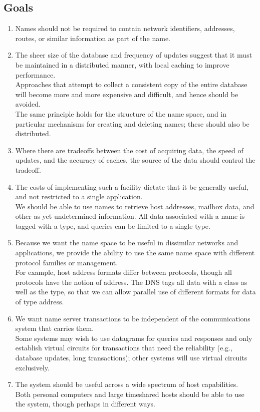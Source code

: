 \subsection{Goals}
\begin{enumerate}
\item{Names should not be required to contain network identifiers, addresses, routes, or similar information as part of the name.}
\item{The sheer size of the database and frequency of updates suggest that it must be maintained in a distributed manner, with local caching to improve performance.\\
Approaches that attempt to collect a consistent copy of the entire database will become more and more expensive and difficult, and hence should be avoided.\\
The same principle holds for the structure of the name space, and in particular mechanisms for creating and deleting names; these should also be distributed.}
\item{Where there are tradeoffs between the cost of acquiring data, the speed of updates, and the accuracy of caches, the source of the data should control the tradeoff.}
\item{The costs of implementing such a facility dictate that it be generally useful, and not restricted to a single application.\\
We should be able to use names to retrieve host addresses, mailbox data, and other as yet undetermined information. All data associated with a name is tagged with a type, and queries can be limited to a single type.}
\item{Because we want the name space to be useful in dissimilar networks and applications, we provide the ability to use the same name space with different protocol families or management.\\
For example, host address formats differ between protocols, though all protocols have the notion of address. The DNS tags all data with a class as well as the type, so that we can allow parallel use of different formats for data of type address.}
\item{We want name server transactions to be independent of the communications system that carries them.\\
Some systems may wish to use datagrams for queries and responses and only establish virtual circuits for transactions that need the reliability (e.g., database updates, long transactions); other systems will use virtual circuits exclusively.}
\item{The system should be useful across a wide spectrum of host capabilities.\\
Both personal computers and large timeshared hosts should be able to use the system, though perhaps in different ways.}
\end{enumerate}

